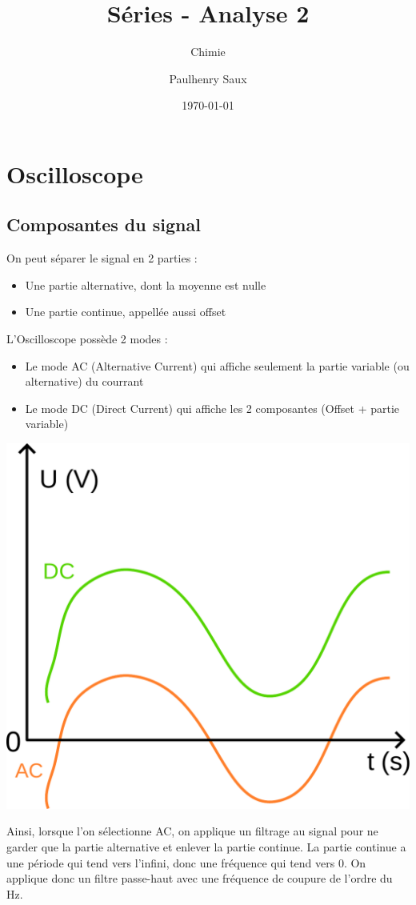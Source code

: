 \documentclass[french]{yLectureNote}
\title{Séries - Analyse 2}
\subtitle{Chimie}
\author{Paulhenry Saux}
\date{\today}
\begin{document}
\setcounter{chapter}{0}
\chapter{Oscilloscope }
\section{Composantes du signal}
On peut séparer le signal en 2 parties :
\begin{itemize}
 \item Une partie alternative, dont la moyenne est nulle
 \item Une partie continue, appellée aussi offset
\end{itemize}
L'Oscilloscope possède 2 modes :
\begin{itemize}
 \item Le mode AC (Alternative Current) qui affiche seulement la partie variable (ou alternative) du courrant
 \item Le mode DC (Direct Current) qui affiche les 2 composantes (Offset + partie variable)
\end{itemize}
\includegraphics[scale=0.5]{path1}

Ainsi, lorsque l'on sélectionne AC, on applique un filtrage au signal pour ne garder que la partie alternative et enlever la partie continue. La partie continue a une période qui tend vers l'infini, donc une fréquence qui tend vers 0. On applique donc un filtre passe-haut  avec une fréquence de coupure de l'ordre du Hz.
\end{document}
